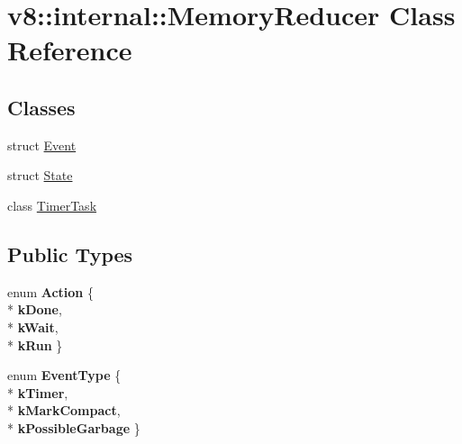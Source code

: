 \hypertarget{classv8_1_1internal_1_1_memory_reducer}{}\section{v8\+:\+:internal\+:\+:Memory\+Reducer Class Reference}
\label{classv8_1_1internal_1_1_memory_reducer}
\subsection*{Classes}
\begin{DoxyCompactItemize}
\item 
struct \hyperlink{structv8_1_1internal_1_1_memory_reducer_1_1_event}{Event}
\item 
struct \hyperlink{structv8_1_1internal_1_1_memory_reducer_1_1_state}{State}
\item 
class \hyperlink{classv8_1_1internal_1_1_memory_reducer_1_1_timer_task}{Timer\+Task}
\end{DoxyCompactItemize}
\subsection*{Public Types}
\begin{DoxyCompactItemize}
\item 
enum {\bfseries Action} \{ \\*
{\bfseries k\+Done}, 
\\*
{\bfseries k\+Wait}, 
\\*
{\bfseries k\+Run}
 \}\hypertarget{classv8_1_1internal_1_1_memory_reducer_a458cd23d6f4121f9bd6bd3e3d241b4a7}{}\label{classv8_1_1internal_1_1_memory_reducer_a458cd23d6f4121f9bd6bd3e3d241b4a7}

\item 
enum {\bfseries Event\+Type} \{ \\*
{\bfseries k\+Timer}, 
\\*
{\bfseries k\+Mark\+Compact}, 
\\*
{\bfseries k\+Possible\+Garbage}
 \}\hypertarget{classv8_1_1internal_1_1_memory_reducer_a2853ab10b53e2913c5e06cc170d2d3bf}{}\label{classv8_1_1internal_1_1_memory_reducer_a2853ab10b53e2913c5e06cc170d2d3bf}

\end{DoxyCompactItemize}
